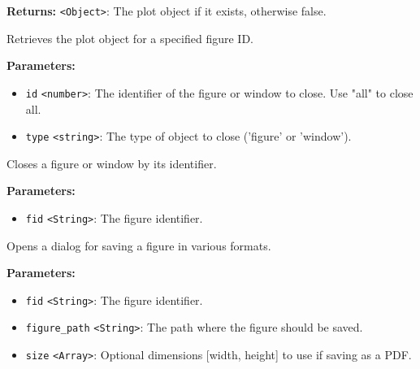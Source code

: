 \documentclass[12pt,a4paper]{article}
\begin{document}
\noindent \textbf{Returns:} \texttt{<Object>}: The plot object if it exists, otherwise \textasciigrave{}false\textasciigrave{}.

\noindent Retrieves the plot object for a specified figure ID.

\vspace{5mm}
\noindent {}


\noindent \textbf{Parameters:}
\begin{itemize}
  \item \texttt{id} \texttt{<number>}: The identifier of the figure or window to close. Use "all" to close all.
  \item \texttt{type} \texttt{<string>}: The type of object to close ('figure' or 'window').
\end{itemize}

\noindent Closes a figure or window by its identifier.

\vspace{5mm}
\noindent {}


\noindent \textbf{Parameters:}
\begin{itemize}
  \item \texttt{fid} \texttt{<String>}: The figure identifier.
\end{itemize}

\noindent Opens a dialog for saving a figure in various formats.

\vspace{5mm}
\noindent {}


\noindent \textbf{Parameters:}
\begin{itemize}
  \item \texttt{fid} \texttt{<String>}: The figure identifier.
  \item \texttt{figure\_path} \texttt{<String>}: The path where the figure should be saved.
  \item \texttt{size} \texttt{<Array>}: Optional dimensions [width, height] to use if saving as a PDF.
\end{itemize}
\end{document}
